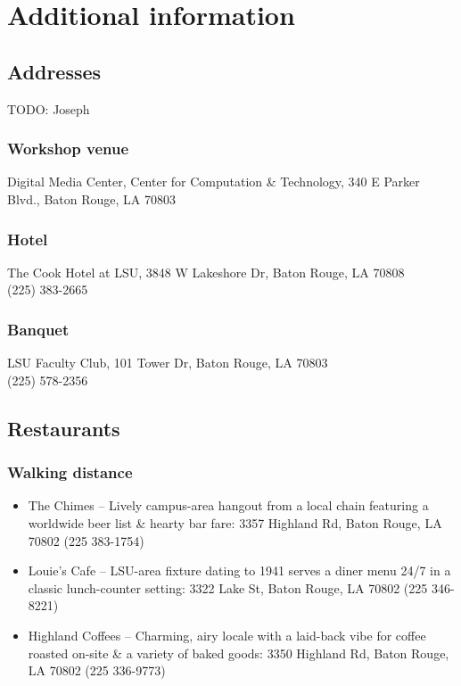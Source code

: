 \documentclass[12pt,letterpaper]{book}
\begin{document}
%
%
%

\chapter{Additional information}

\section{Addresses}

TODO: Joseph

\subsection*{Workshop venue}
Digital Media Center, Center for Computation \& Technology, 340 E Parker Blvd., Baton Rouge, LA 70803
\subsection*{Hotel}
The Cook Hotel at LSU, 3848 W Lakeshore Dr, Baton Rouge, LA 70808 \\
(225) 383-2665
\subsection*{Banquet}
LSU Faculty Club, 101 Tower Dr, Baton Rouge, LA 70803 \\
(225) 578-2356

\section{Restaurants}

\subsection*{Walking distance}

\begin{itemize}
\item The Chimes -- Lively campus-area hangout from a local chain featuring a worldwide beer list \& hearty bar fare: 3357 Highland Rd, Baton Rouge, LA 70802 (225 383-1754)
\item Louie's Cafe -- LSU-area fixture dating to 1941 serves a diner menu 24/7 in a classic lunch-counter setting: 3322 Lake St, Baton Rouge, LA 70802 (225 346-8221)
\item Highland Coffees -- Charming, airy locale with a laid-back vibe for coffee roasted on-site \& a variety of baked goods: 3350 Highland Rd, Baton Rouge, LA 70802 (225 336-9773)
\end{itemize}
\end{document}
